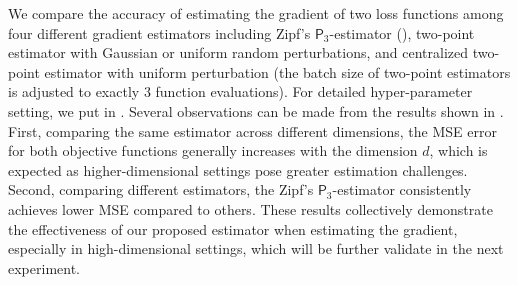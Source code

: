 \documentclass{article}
\theoremstyle{definition}
\theoremstyle{plain}
\theoremstyle{remark}
\newcommand{\sfP}{\mathsf{P}}
\begin{document}
We compare the accuracy of estimating the gradient of two loss functions among four different gradient estimators including Zipf's $\sfP_3$-estimator (), two-point estimator with Gaussian or uniform random perturbations, and centralized two-point estimator with uniform perturbation
(the batch size of two-point estimators is adjusted to exactly $3$ function evaluations). For detailed hyper-parameter setting, we put in .  Several observations can be made from the results shown in . First,  comparing the same estimator across different dimensions, the MSE error for both objective functions generally increases with the dimension $d$, which is expected as higher-dimensional settings pose greater estimation challenges. Second, comparing different estimators,  the Zipf's $\sfP_3$-estimator consistently achieves lower MSE compared to others.   These results collectively demonstrate the effectiveness of our proposed estimator when estimating the gradient, especially in high-dimensional settings, which will be further validate in the next experiment. 

 
 

 

\end{document}
